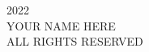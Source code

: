 \documentclass[crop=false,12pt,class=report]{standalone}
\begin{document}
\null
\vfill 

\begin{singlespace}
    \begin{center}
        \textcopyright{} 2022\\
        {\color{red} YOUR NAME HERE}\\
        \uppercase{all rights reserved}
    \end{center}
\end{singlespace}

\setcounter{page}{2}
\restoregeometry
\end{document}
